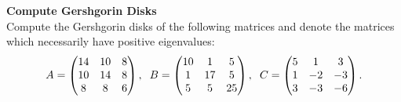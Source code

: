 \textbf{Compute Gershgorin Disks}\\
Compute the Gershgorin disks of the following matrices and denote the matrices which necessarily have positive eigenvalues:
\label{ex:gershgorin_home}
\begin{align*}
A=\begin{pmatrix}
14&10&8\\
10&14&8\\
8&8&6
\end{pmatrix}, \hspace{.2cm}
B=\begin{pmatrix}
10&1&5\\
1&17&5\\
5&5&25
\end{pmatrix}, \hspace{.2cm}
C=\begin{pmatrix}
5&1&3\\
1&-2&-3\\
3&-3&-6
\end{pmatrix}.
\end{align*}